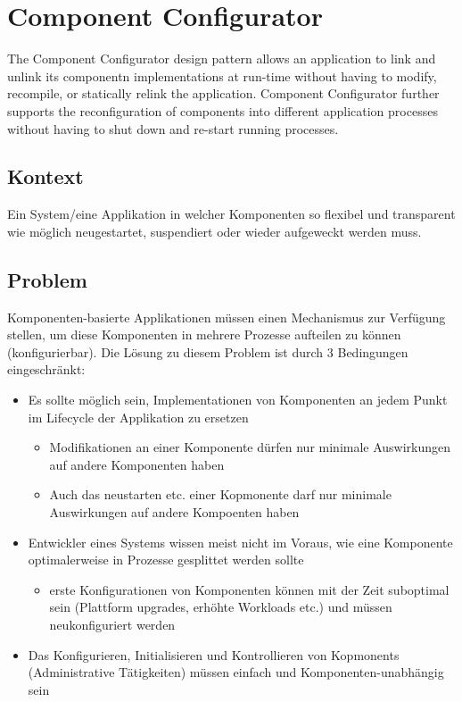 \section{Component Configurator}

The Component Configurator design pattern allows an application to link and unlink its componentn implementations at run-time without having to modify, recompile, or statically relink the application. Component Configurator further supports the reconfiguration of components into different application processes without having to shut down and re-start running processes.

\subsection*{Kontext}

Ein System/eine Applikation in welcher Komponenten so flexibel und transparent wie möglich neugestartet, suspendiert oder wieder aufgeweckt werden muss.

\subsection*{Problem}

Komponenten-basierte Applikationen müssen einen Mechanismus zur Verfügung stellen, um diese Komponenten in mehrere Prozesse aufteilen zu können (konfigurierbar).
Die Lösung zu diesem Problem ist durch 3 Bedingungen eingeschränkt:

\begin{itemize}
	\item Es sollte möglich sein, Implementationen von Komponenten an jedem Punkt im Lifecycle der Applikation zu ersetzen
	\begin{itemize}
		\item Modifikationen an einer Komponente dürfen nur minimale Auswirkungen auf andere Komponenten haben
		\item Auch das neustarten etc. einer Kopmonente darf nur minimale Auswirkungen auf andere Kompoenten haben
	\end{itemize}
	\item Entwickler eines Systems wissen meist nicht im Voraus, wie eine Komponente optimalerweise in Prozesse gesplittet werden sollte
	\begin{itemize}
		\item erste Konfigurationen von Komponenten können mit der Zeit suboptimal sein (Plattform upgrades, erhöhte Workloads etc.) und müssen neukonfiguriert werden
	\end{itemize}
	\item Das Konfigurieren, Initialisieren und Kontrollieren von Kopmonents (Administrative Tätigkeiten) müssen einfach und Komponenten-unabhängig sein
\end{itemize}

